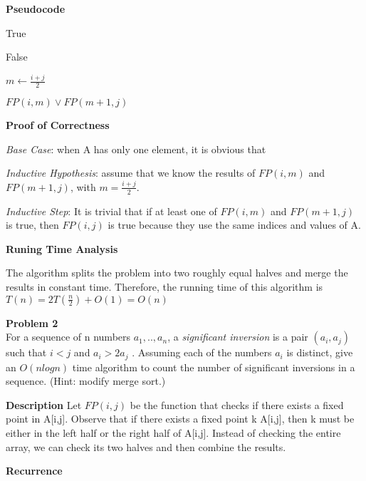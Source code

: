\documentclass[12pt,article]{article}
\newenvironment{problem}[2][Problem]
    { \begin{mdframed}[backgroundcolor=gray!20] \textbf{#1 #2} \\}
    {  \end{mdframed}}
\begin{document}
\textbf{Pseudocode}

\begin{algorithm}
\caption{$FP(i,j)$}\label{alg:q2}
\begin{algorithmic}

            \Return True
        \Else 

            \Return False
        \EndIf
    \EndIf

    \State $m \gets \frac{i+j}{2}$

    \Return $FP(i,m) \lor FP(m+1,j)$
\end{algorithmic}
\end{algorithm}

\textbf{Proof of Correctness}

\textit{Base Case}: when A has only one element, it is obvious that 


\textit{Inductive Hypothesis}: assume that we know the results of $FP(i,m)$ and $FP(m+1,j)$, with $m = \frac{i+j}{2}$.

\textit{Inductive Step}: It is trivial that if at least one of $FP(i,m)$ and $FP(m+1,j)$ is true, then $FP(i,j)$ is true because they use the same indices and values of A.

\textbf{Runing Time Analysis}

The algorithm splits the problem into two roughly equal halves and merge the results in constant time. Therefore, the running time of this algorithm is $T(n) = 2T(\frac{n}{2}) + O(1) = O(n)$

\newpage
\begin{problem}{2} 
For a sequence of n numbers $a_1, .., a_n$, a \textit{significant inversion} is a pair $(a_i, a_j)$ such that $i < j$ and $a_i > 2a_j$ . Assuming each of the numbers $a_i$ is distinct, give an $O(nlogn)$ time algorithm to count the number of significant inversions in a sequence. (Hint: modify merge sort.)
\end{problem}

\textbf{Description}
Let $FP(i,j)$ be the function that checks if there exists a fixed point in A[i,j]. Observe that if there exists a fixed point k A[i,j], then k must be either in the left half or the right half of A[i,j]. Instead of checking the entire array, we can check its two halves and then combine the results.

\textbf{Recurrence}
\end{document}
